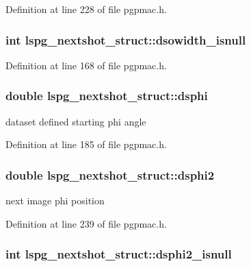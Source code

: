 Definition at line 228 of file pgpmac.h.\hypertarget{structlspg__nextshot__struct_a5dd3db64790e09bc03499e521bbaa126}{
\subsubsection[{dsowidth\_\-isnull}]{\setlength{\rightskip}{0pt plus 5cm}int {\bf lspg\_\-nextshot\_\-struct::dsowidth\_\-isnull}}}
\label{structlspg__nextshot__struct_a5dd3db64790e09bc03499e521bbaa126}


Definition at line 168 of file pgpmac.h.\hypertarget{structlspg__nextshot__struct_a64ebde597ca97a3b98145dc2d580c64f}{
\subsubsection[{dsphi}]{\setlength{\rightskip}{0pt plus 5cm}double {\bf lspg\_\-nextshot\_\-struct::dsphi}}}
\label{structlspg__nextshot__struct_a64ebde597ca97a3b98145dc2d580c64f}


dataset defined starting phi angle 

Definition at line 185 of file pgpmac.h.\hypertarget{structlspg__nextshot__struct_a98857616b6bbb6ba861e96b6b7551756}{
\subsubsection[{dsphi2}]{\setlength{\rightskip}{0pt plus 5cm}double {\bf lspg\_\-nextshot\_\-struct::dsphi2}}}
\label{structlspg__nextshot__struct_a98857616b6bbb6ba861e96b6b7551756}


next image phi position 

Definition at line 239 of file pgpmac.h.\hypertarget{structlspg__nextshot__struct_a57a9c43be86188f65b96d59c2adec674}{
\subsubsection[{dsphi2\_\-isnull}]{\setlength{\rightskip}{0pt plus 5cm}int {\bf lspg\_\-nextshot\_\-struct::dsphi2\_\-isnull}}}
\label{structlspg__nextshot__struct_a57a9c43be86188f65b96d59c2adec674}


